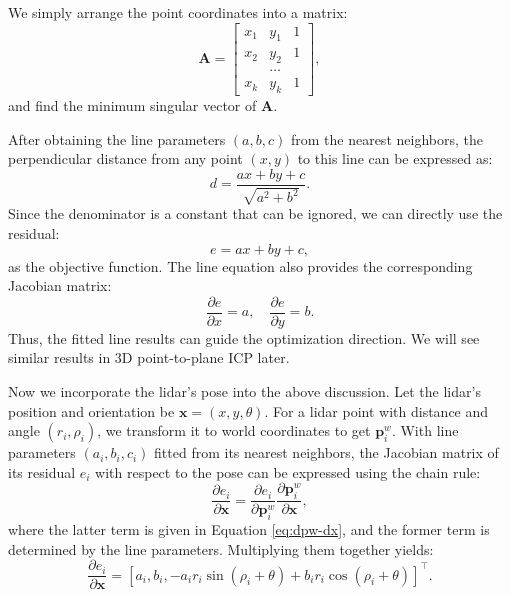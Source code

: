 We simply arrange the point coordinates into a matrix:
\begin{equation}\label{key}
	\mathbf{A} = \begin{bmatrix}
		x_1 & y_1 & 1 \\
		x_2 & y_2 & 1 \\
		& \ldots &\\
		x_k & y_k & 1
	\end{bmatrix},
\end{equation}
and find the minimum singular vector of $\mathbf{A}$.

After obtaining the line parameters $(a,b,c)$ from the nearest neighbors, the perpendicular distance from any point $(x,y)$ to this line can be expressed as:
\begin{equation}\label{key}
	d = \frac{ax+by+c}{\sqrt{a^2+b^2}}.
\end{equation}
Since the denominator is a constant that can be ignored, we can directly use the residual:
\begin{equation}\label{key}
	e = ax+by+c,
\end{equation}
as the objective function. The line equation also provides the corresponding Jacobian matrix:
\begin{equation}\label{key}
	\frac{\partial e}{\partial x} = a, \quad \frac{\partial e}{\partial y} = b.
\end{equation}
Thus, the fitted line results can guide the optimization direction. We will see similar results in 3D point-to-plane ICP later.

Now we incorporate the lidar's pose into the above discussion. Let the lidar's position and orientation be $\mathbf{x} = (x,y, \theta)$. For a lidar point with distance and angle $(r_i, \rho_i)$, we transform it to world coordinates to get $\mathbf{p}_i^w$. With line parameters $(a_i, b_i, c_i)$ fitted from its nearest neighbors, the Jacobian matrix of its residual $e_i$ with respect to the pose can be expressed using the chain rule:
\begin{equation}\label{key}
	\frac{\partial e_i}{\partial \mathbf{x}} = \frac{\partial e_i}{\partial \mathbf{p}_i^w} \frac{\partial \mathbf{p}_i^w}{\partial \mathbf{x}},
\end{equation} 
where the latter term is given in Equation \eqref{eq:dpw-dx}, and the former term is determined by the line parameters. Multiplying them together yields:
\begin{equation}\label{key}
	\frac{\partial e_i}{\partial \mathbf{x}} = [a_i, b_i, -a_i r_i \sin(\rho_i + \theta) + b_i r_i \cos(\rho_i + \theta)]^\top.
\end{equation}


